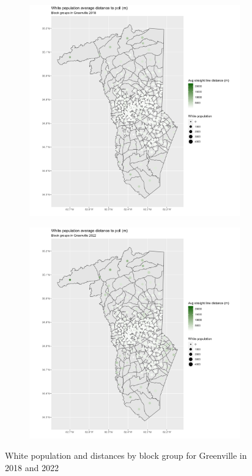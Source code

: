\documentclass[11pt]{article}
\theoremstyle{remark}
\theoremstyle{definition}
\begin{document}
\begin{figure}
	\begin{subfigure}{.5\textwidth}
		\centering
		\includegraphics[width=\linewidth]{result_analysis/Greenville_SC_original_configs/white_pop_and_dist_Greenville_config_original_2018_polls.png}
		\label{sfig:York_2018_bg_dist_pop}
	\end{subfigure} 
	\begin{subfigure}{.5\textwidth}
		\centering
		\includegraphics[width=\linewidth]{result_analysis/Greenville_SC_original_configs/white_pop_and_dist_Greenville_config_original_2022_polls.png}
		\label{sfig:Greenville_2022_bg_dist}
	\end{subfigure}
	\caption{White population and distances by block group for Greenville in 2018 and 2022}
	\label{fig:Greenville distance White population maps}
\end{figure}
\end{document}
